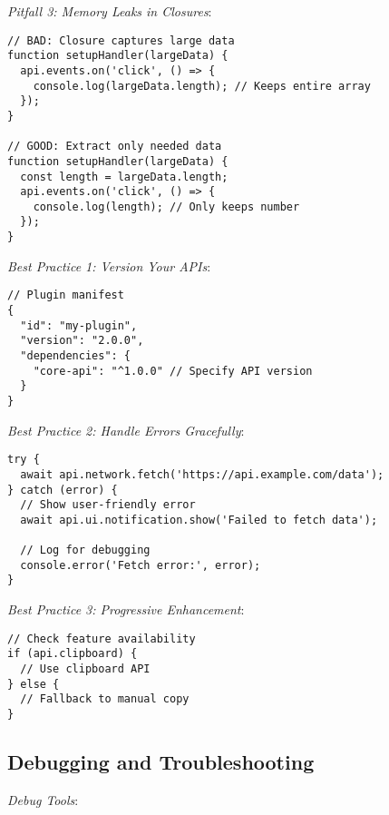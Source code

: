 \documentclass[11pt]{article}
\begin{document}
\emph{Pitfall 3: Memory Leaks in Closures}:

\begin{verbatim}
// BAD: Closure captures large data
function setupHandler(largeData) {
  api.events.on('click', () => {
    console.log(largeData.length); // Keeps entire array
  });
}

// GOOD: Extract only needed data
function setupHandler(largeData) {
  const length = largeData.length;
  api.events.on('click', () => {
    console.log(length); // Only keeps number
  });
}
\end{verbatim}

\emph{Best Practice 1: Version Your APIs}:

\begin{verbatim}
// Plugin manifest
{
  "id": "my-plugin",
  "version": "2.0.0",
  "dependencies": {
    "core-api": "^1.0.0" // Specify API version
  }
}
\end{verbatim}

\emph{Best Practice 2: Handle Errors Gracefully}:

\begin{verbatim}
try {
  await api.network.fetch('https://api.example.com/data');
} catch (error) {
  // Show user-friendly error
  await api.ui.notification.show('Failed to fetch data');
  
  // Log for debugging
  console.error('Fetch error:', error);
}
\end{verbatim}

\emph{Best Practice 3: Progressive Enhancement}:

\begin{verbatim}
// Check feature availability
if (api.clipboard) {
  // Use clipboard API
} else {
  // Fallback to manual copy
}
\end{verbatim}
\subsection{Debugging and Troubleshooting}
\label{sec:org1521202}

\emph{Debug Tools}:
\end{document}
